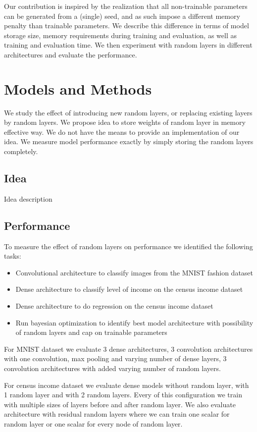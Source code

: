 \documentclass[]{article}
\begin{document}
\begin{multicols}{2}
	Our contribution is inspired by the realization that all non-trainable parameters can be generated from a (single) seed, and as such impose a different memory penalty than trainable parameters. We describe this difference in terms of model storage size, memory requirements during training and evaluation, as well as training and evaluation time. We then experiment with random layers in different architectures and evaluate the performance.
	
	\section{Models and Methods}
	We study the effect of introducing new random layers, or replacing existing layers by random layers. We propose idea to store weights of random layer in memory effective way. We do not have the means to provide an implementation of our idea. We measure model performance exactly by simply storing the random layers completely.
	
	\subsection{Idea}
	Idea description
	
	
	\subsection{Performance}
	To measure the effect of random layers on performance we identified the following tasks:
	\begin{itemize}
		\itemsep0em
		\item Convolutional architecture to classify images from the MNIST fashion dataset
		\item Dense architecture to classify level of income on the census income dataset
		\item Dense architecture to do regression on the census income dataset
		\item Run bayesian optimization to identify best model architecture with possibility of random layers and cap on trainable parameters
	\end{itemize}
	For MNIST dataset we evaluate 3 dense architectures, 3 convolution architectures with one convolution, max pooling and varying number of dense layers, 3 convolution architectures with added varying number of random layers.

	For census income dataset we evaluate dense models without random layer, with 1 random layer and with 2 random layers. Every of this configuration we train with multiple sizes of layers before and after random layer. We also evaluate architecture with residual random layers where we can train one scalar for random layer or one scalar for every node of random layer.
	

\end{multicols}
\end{document}
